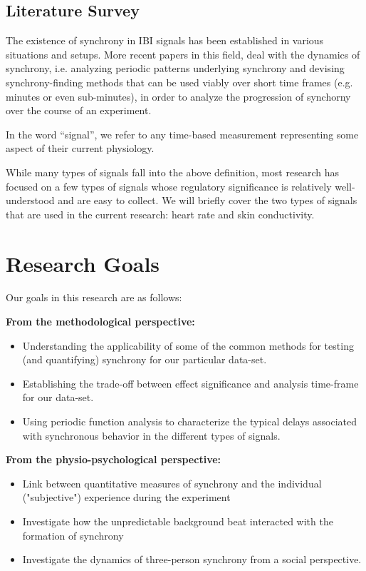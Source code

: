 \documentclass[a4paper, 11pt]{article}      %
\begin{document}
\subsection{Literature Survey}
The existence of synchrony in IBI signals has been established in various situations and setups. More recent papers in this field, deal with the dynamics of synchrony, i.e. analyzing periodic patterns underlying synchrony and devising synchrony-finding methods that can be used viably over short time frames (e.g. minutes or even sub-minutes), in order to analyze the progression of synchorny over the course of an experiment. 




In the word ``signal'', we refer to any time-based measurement representing some aspect of their current physiology.


While many types of signals fall into the above definition, most research has focused on a few types of signals whose regulatory significance is relatively well-understood and are easy to collect. We will briefly cover the two types of signals that are used in the current research: heart rate and skin conductivity.


\section{Research Goals}
Our goals in this research are as follows: 

\textbf{From the methodological perspective:}
\begin{itemize}
\item Understanding the applicability of some of the common methods for testing (and quantifying) synchrony for our particular data-set.
\item Establishing the trade-off between effect significance and analysis time-frame for our data-set.
\item Using periodic function analysis to characterize the typical delays associated with synchronous behavior in the different types of signals.   
\end{itemize}

\textbf{From the physio-psychological perspective:}
\begin{itemize}
\item Link between quantitative measures of synchrony and the individual ("subjective") experience during the experiment
\item Investigate how the unpredictable background beat interacted with the formation of synchrony
\item Investigate the dynamics of three-person synchrony from a social perspective.
\end{itemize}
\end{document}
